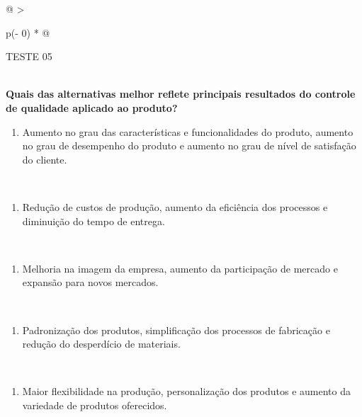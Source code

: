 \documentclass[
]{book}
\providecommand{\tightlist}{%
  \setlength{\itemsep}{0pt}\setlength{\parskip}{0pt}}
\begin{document}
\begin{longtable}[]{@{}
  >{\raggedright\arraybackslash}p{(\columnwidth - 0\tabcolsep) * }@{}}
\toprule\noalign{}
\begin{minipage}[b]{\linewidth}\raggedright
TESTE 05
\end{minipage} \\
\midrule\noalign{}
\endhead
\bottomrule\noalign{}
\endlastfoot
\textbf{Quais das alternativas melhor reflete principais resultados do controle de qualidade aplicado ao produto?} \\
\begin{minipage}[t]{\linewidth}\raggedright
\begin{enumerate}
\def\labelenumi{\alph{enumi})}
\tightlist
\item
  Aumento no grau das características e funcionalidades do produto, aumento no grau de desempenho do produto e aumento no grau de nível de satisfação do cliente.
\end{enumerate}
\end{minipage} \\
\begin{minipage}[t]{\linewidth}\raggedright
\begin{enumerate}
\def\labelenumi{\alph{enumi})}
\setcounter{enumi}{1}
\tightlist
\item
  Redução de custos de produção, aumento da eficiência dos processos e diminuição do tempo de entrega.
\end{enumerate}
\end{minipage} \\
\begin{minipage}[t]{\linewidth}\raggedright
\begin{enumerate}
\def\labelenumi{\alph{enumi})}
\setcounter{enumi}{2}
\tightlist
\item
  Melhoria na imagem da empresa, aumento da participação de mercado e expansão para novos mercados.
\end{enumerate}
\end{minipage} \\
\begin{minipage}[t]{\linewidth}\raggedright
\begin{enumerate}
\def\labelenumi{\alph{enumi})}
\setcounter{enumi}{3}
\tightlist
\item
  Padronização dos produtos, simplificação dos processos de fabricação e redução do desperdício de materiais.
\end{enumerate}
\end{minipage} \\
\begin{minipage}[t]{\linewidth}\raggedright
\begin{enumerate}
\def\labelenumi{\alph{enumi})}
\setcounter{enumi}{4}
\tightlist
\item
  Maior flexibilidade na produção, personalização dos produtos e aumento da variedade de produtos oferecidos.
\end{enumerate}
\end{minipage} \\
\end{longtable}
\end{document}
